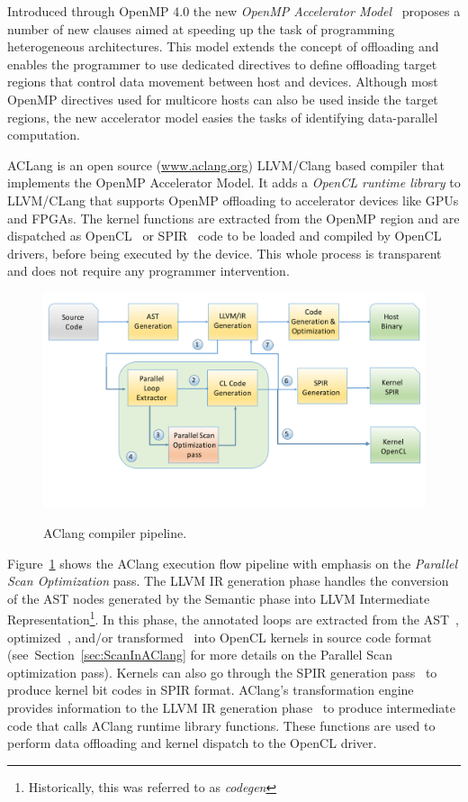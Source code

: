 \documentclass[Ingles]{ic-tese-v1}
\newcommand{\rsec}[1]{Section~\ref{sec:#1}}
\newcommand{\rfig}[1]{Figure~\ref{fig:#1}}
\newcommand{\tit}[1]{{\textit{#1}}}
\begin{document}
Introduced  through   OpenMP  4.0  the  new   \tit{OpenMP  Accelerator
Model}~\cite{Liao2013}  proposes a  number of  new clauses  aimed at
speeding up the task  of programming heterogeneous architectures. This
model extends the concept of  offloading and enables the programmer to
use  dedicated directives  to  define offloading  target regions  that
control data movement between host  and devices.  Although most OpenMP
directives used  for multicore  hosts can also  be used  inside the target
regions, the  new accelerator  model easies  the tasks  of identifying
data-parallel computation.

ACLang is an  open  source (\url{www.aclang.org})  LLVM/Clang
based compiler that implements the  OpenMP Accelerator Model.  It adds
a {\em  OpenCL runtime  library} to  LLVM/CLang that  supports OpenMP
offloading to  accelerator devices  like GPUs  and FPGAs.   The kernel
functions are extracted  from the OpenMP region and  are dispatched as
OpenCL~\cite{opencl}  or  SPIR~\cite{spir}  code   to  be  loaded  and
compiled by OpenCL  drivers, before being executed by  the device. This
whole  process is  transparent  and does  not  require any  programmer
intervention.

\begin{figure}[t]
	\caption{AClang compiler pipeline.}
	\centering
	\includegraphics[scale=0.45]{images/aclang_scan.pdf}
	\label{fig:aclang}
\end{figure}


\rfig{aclang} shows  the AClang execution flow  pipeline with
emphasis on the \textit{Parallel Scan Optimization} pass.  The
LLVM IR generation phase handles the conversion of the AST
nodes  generated   by  the  Semantic  phase   into  LLVM  Intermediate
Representation\footnote{Historically,   this  was   referred  to   as
	\textit{codegen}}.  In this phase, the annotated loops are extracted
from     the      AST~,     optimized~,     and/or
transformed~  into  OpenCL  kernels in  source  code  format~
(see~\rsec{ScanInAClang}   for  more   details   on  the   Parallel Scan
optimization pass).   Kernels can also go  through the SPIR
generation pass~ to produce kernel bit codes in SPIR format.
AClang's  transformation engine~  provides information
to  the LLVM  IR generation  phase~ to  produce intermediate
code  that  calls  AClang   runtime  library  functions.   These
functions are used  to perform data offloading and  kernel dispatch to
the  OpenCL  driver.
\end{document}
